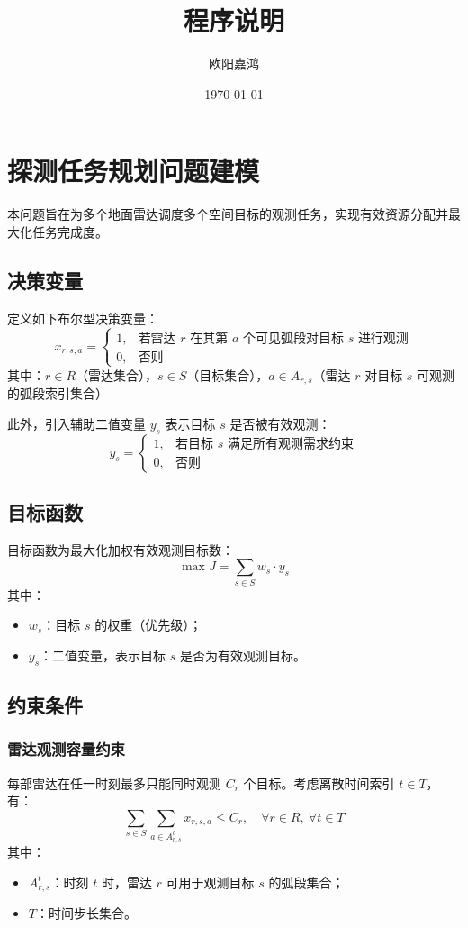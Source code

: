 \documentclass[openany,12pt,UTF8]{ctexart}
\title{程序说明}
\author{欧阳嘉鸿}
\date{\today}
\begin{document}
\maketitle
\newpage
\tableofcontents
\newpage
\section{探测任务规划问题建模}
本问题旨在为多个地面雷达调度多个空间目标的观测任务，实现有效资源分配并最大化任务完成度。

\subsection{决策变量}
定义如下布尔型决策变量：
$$
    x_{r,s,a} =
    \begin{cases}
        1, & \text{若雷达 } r \text{ 在其第 } a \text{ 个可见弧段对目标 } s \text{ 进行观测} \\
        0, & \text{否则}
    \end{cases}
$$
其中：$r \in R$（雷达集合），$s \in S$（目标集合），$a \in A_{r,s}$（雷达 $r$ 对目标 $s$ 可观测的弧段索引集合）

此外，引入辅助二值变量 $y_s$ 表示目标 $s$ 是否被有效观测：
$$
    y_s =
    \begin{cases}
        1, & \text{若目标 } s \text{ 满足所有观测需求约束} \\
        0, & \text{否则}
    \end{cases}
$$

\subsection{目标函数}
目标函数为最大化加权有效观测目标数：
$$
    \max J = \sum_{s \in S} w_s \cdot y_s
$$
其中：
\begin{itemize}
    \item $w_s$：目标 $s$ 的权重（优先级）；
    \item $y_s$：二值变量，表示目标 $s$ 是否为有效观测目标。
\end{itemize}

\subsection{约束条件}
\subsubsection{雷达观测容量约束}
每部雷达在任一时刻最多只能同时观测 $C_r$ 个目标。考虑离散时间索引 $t \in T$，有：
$$
    \sum_{s \in S} \sum_{a \in A_{r,s}^t} x_{r,s,a} \leq C_r, \quad \forall r \in R,\ \forall t \in T
$$
其中：
\begin{itemize}
    \item $A_{r,s}^t$：时刻 $t$ 时，雷达 $r$ 可用于观测目标 $s$ 的弧段集合；
    \item $T$：时间步长集合。
\end{itemize}
\end{document}
